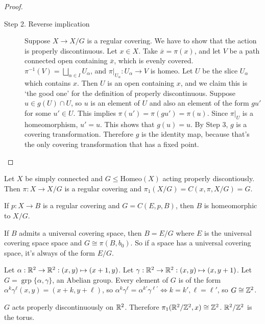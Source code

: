 \begin{proof}
\begin{description}
        \item[Step 2. Reverse implication]
            Suppose $X \to  X / G$ is a regular covering.
            We have to show that the action is properly discontinuous.
            Let $x \in X$.
            Take $\overline{x} = \pi(x)$, and let $V$ be a path connected open containing $\overline{x}$, which is evenly covered.
            $\pi^{-1}(V) = \bigsqcup_{\alpha \in I} U_\alpha$, and $\pi|_{U_\alpha}: U_\alpha \to  V$ is homeo.
            Let $U$ be the slice $U_\alpha$ which contains $x$.
            Then $U$ is an open containing $x$, and we claim this is `the good one' for the definition of properly discontinuous.
            Suppose $u \in  g(U) \cap  U$, so $u$ is an element of $U$ and also an element of the form $gu'$ for some  $u' \in U$.
            This implies $\pi(u') = \pi( g u') = \pi(u)$.
            Since  $\pi|_U$ is a homeomorphism,  $u' = u$.
            This shows that $g(u) = u$.
            By Step 3, $g$ is a covering transformation.
            Therefore $g$ is the identity map, because that's the only covering transformation that has a fixed point.
    \end{description}
\end{proof}

\begin{corollary}
    Let $X$ be simply connected and $G \le \text{Homeo}(X)$ acting properly discontiously.
    Then $\pi: X \to  X / G$ is a regular covering and $\pi_1( X / G) = C(x, \pi, X / G) = G$.
\end{corollary}

\begin{remark}
    If $p: X \to  B$ is a regular covering and $G = C(E, p, B)$,
    then $B$ is homeomorphic to $X / G$.

    If $B$ admits a universal covering space, then $B = E / G$ where $E$ is the universal covering space  space and $G \cong \pi(B,b_0)$.
    So if a space has a universal covering space, it's always of the form $E / G$.
\end{remark}

\begin{eg}
    Let $\alpha: \mathbb{R}^2 \to  \mathbb{R}^2: (x, y) \mapsto (x+1, y)$.
    Let $\gamma: \mathbb{R}^2\to \mathbb{R}^2: (x, y) \mapsto  (x, y+1)$.
    Let $G = \operatorname{grp} \{\alpha, \gamma\}$, an Abelian group.
    Every element of $G$ is of the form $\alpha ^{k} \gamma ^{\ell}(x, y) = (x+k, y+\ell)$,
    so $\alpha ^{k} \gamma^{\ell} = \alpha ^{k'} \gamma^{\ell'} \iff k = k', \ell = \ell'$, so $G \cong \mathbb{Z}^2$.

    $G$ acts properly discontinuously on $\mathbb{R}^2$.
    Therefore $\pi_1(\mathbb{R}^2 / \mathbb{Z}^2, x) \cong \mathbb{Z}^2$.
    $\mathbb{R}^2 / \mathbb{Z}^2$ is the torus.
\end{eg}

